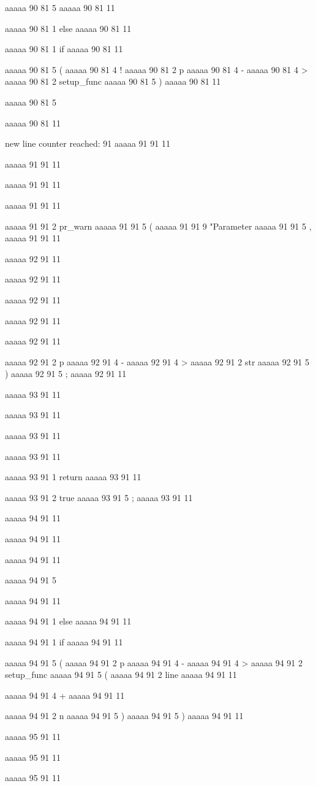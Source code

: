 {{{{aaaaa 90 81
5
}
aaaaa 90 81
11
 
aaaaa 90 81
1
else
aaaaa 90 81
11
 
aaaaa 90 81
1
if
aaaaa 90 81
11
 
aaaaa 90 81
5
(
aaaaa 90 81
4
!
aaaaa 90 81
2
p
aaaaa 90 81
4
-
aaaaa 90 81
4
>
aaaaa 90 81
2
setup_func
aaaaa 90 81
5
)
aaaaa 90 81
11
 
aaaaa 90 81
5
{
aaaaa 90 81
11


new line counter reached: 91
aaaaa 91 91
11
	
aaaaa 91 91
11
	
aaaaa 91 91
11
	
aaaaa 91 91
11
	
aaaaa 91 91
2
pr_warn
aaaaa 91 91
5
(
aaaaa 91 91
9
"Parameter %
aaaaa 91 91
5
,
aaaaa 91 91
11


aaaaa 92 91
11
	
aaaaa 92 91
11
	
aaaaa 92 91
11
	
aaaaa 92 91
11
	
aaaaa 92 91
11
	
aaaaa 92 91
2
p
aaaaa 92 91
4
-
aaaaa 92 91
4
>
aaaaa 92 91
2
str
aaaaa 92 91
5
)
aaaaa 92 91
5
;
aaaaa 92 91
11


aaaaa 93 91
11
	
aaaaa 93 91
11
	
aaaaa 93 91
11
	
aaaaa 93 91
11
	
aaaaa 93 91
1
return
aaaaa 93 91
11
 
aaaaa 93 91
2
true
aaaaa 93 91
5
;
aaaaa 93 91
11


aaaaa 94 91
11
	
aaaaa 94 91
11
	
aaaaa 94 91
11
	
aaaaa 94 91
5
}
aaaaa 94 91
11
 
aaaaa 94 91
1
else
aaaaa 94 91
11
 
aaaaa 94 91
1
if
aaaaa 94 91
11
 
aaaaa 94 91
5
(
aaaaa 94 91
2
p
aaaaa 94 91
4
-
aaaaa 94 91
4
>
aaaaa 94 91
2
setup_func
aaaaa 94 91
5
(
aaaaa 94 91
2
line
aaaaa 94 91
11
 
aaaaa 94 91
4
+
aaaaa 94 91
11
 
aaaaa 94 91
2
n
aaaaa 94 91
5
)
aaaaa 94 91
5
)
aaaaa 94 91
11


aaaaa 95 91
11
	
aaaaa 95 91
11
	
aaaaa 95 91
11
	
}}}
